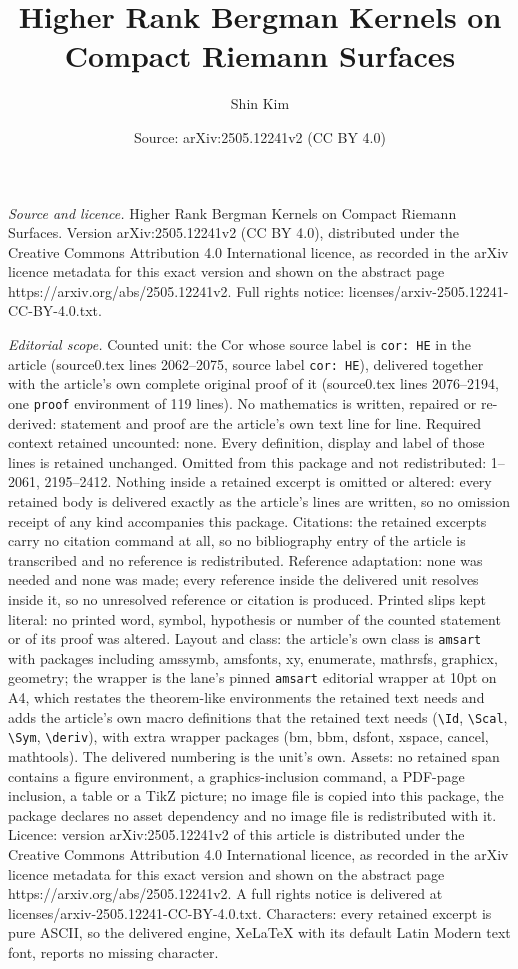 \documentclass[10pt,a4paper]{amsart}
\title[Higher Rank Bergman Kernels on Compact Riemann Surfaces]{Higher Rank Bergman Kernels on Compact Riemann Surfaces}
\author{Shin Kim}
\date{Source: arXiv:2505.12241v2 (CC BY 4.0)}
\begin{document}
\maketitle

\noindent\emph{Source and licence.} Higher Rank Bergman Kernels on Compact Riemann Surfaces. Version arXiv:2505.12241v2 (CC BY 4.0), distributed under the Creative Commons Attribution 4.0 International licence, as recorded in the arXiv licence metadata for this exact version and shown on the abstract page https://arxiv.org/abs/2505.12241v2. Full rights notice: licenses/arxiv-2505.12241-CC-BY-4.0.txt.\par\smallskip

\noindent\textit{Editorial scope.} Counted unit: the Cor whose source label is \texttt{cor: HE} in the article (source0.tex lines 2062--2075, source label \texttt{cor: HE}), delivered together with the article's own complete original proof of it (source0.tex lines 2076--2194, one \texttt{proof} environment of 119 lines). No mathematics is written, repaired or re-derived: statement and proof are the article's own text line for line. Required context retained uncounted: none. Every definition, display and label of those lines is retained unchanged. Omitted from this package and not redistributed: 1--2061, 2195--2412. Nothing inside a retained excerpt is omitted or altered: every retained body is delivered exactly as the article's lines are written, so no omission receipt of any kind accompanies this package. Citations: the retained excerpts carry no citation command at all, so no bibliography entry of the article is transcribed and no reference is redistributed. Reference adaptation: none was needed and none was made; every reference inside the delivered unit resolves inside it, so no unresolved reference or citation is produced. Printed slips kept literal: no printed word, symbol, hypothesis or number of the counted statement or of its proof was altered. Layout and class: the article's own class is \texttt{amsart} with packages including amssymb, amsfonts, xy, enumerate, mathrsfs, graphicx, geometry; the wrapper is the lane's pinned \texttt{amsart} editorial wrapper at 10pt on A4, which restates the theorem-like environments the retained text needs and adds the article's own macro definitions that the retained text needs (\texttt{\textbackslash Id}, \texttt{\textbackslash Scal}, \texttt{\textbackslash Sym}, \texttt{\textbackslash deriv}), with extra wrapper packages (bm, bbm, dsfont, xspace, cancel, mathtools). The delivered numbering is the unit's own. Assets: no retained span contains a figure environment, a graphics-inclusion command, a PDF-page inclusion, a table or a TikZ picture; no image file is copied into this package, the package declares no asset dependency and no image file is redistributed with it. Licence: version arXiv:2505.12241v2 of this article is distributed under the Creative Commons Attribution 4.0 International licence, as recorded in the arXiv licence metadata for this exact version and shown on the abstract page https://arxiv.org/abs/2505.12241v2. A full rights notice is delivered at licenses/arxiv-2505.12241-CC-BY-4.0.txt. Characters: every retained excerpt is pure ASCII, so the delivered engine, XeLaTeX with its default Latin Modern text font, reports no missing character.
\end{document}
